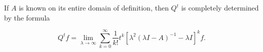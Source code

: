 If $A$ is known on its entire domain of definition, then $Q^t$ is completely determined by the formula

$$Q^t f = \lim_{\lambda \to \infty} \sum_{k=0}^{\infty} \frac{1}{k!} t^k [\lambda^2 (\lambda I - A)^{-1} - \lambda I]^k f.$$
